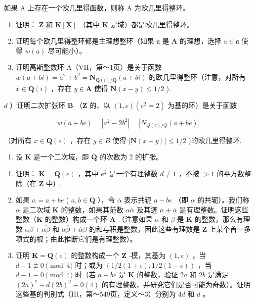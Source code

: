 如果 A 上存在一个欧几里得函数，则称 A 为欧几里得整环。

\begin{enumerate}
\def\labelenumi{\alph{enumi})}
\item
  证明： \(\mathbf{Z}\) 和 \(\mathbf{K}[\mathbf{X}]\) （其中 \(\mathbf{K}\) 是域）都是欧几里得整环。
\item
  证明每个欧几里得整环都是主理想整环（如果 \(\mathfrak{a}\) 是 \(\mathbf{A}\) 的理想，选择 \(a \in \mathfrak{a}\) 使得 \(w(a)\) 尽可能小）。
\item
  证明高斯整数环 A（VII，第～1页）是关于函数 \(w(a + bi) = a^2 + b^2 = \mathbf{N}_{\mathbf{Q}(i) / \mathbf{Q}}(a + bi)\) 的欧几里得整环（注意，对所有 \(x \in \mathbf{Q}(i)\) ，存在 \(y \in \mathbf{A}\) 使得 \(\mathbf{N}(x - y) \leqslant 1/2\) ).
\end{enumerate}

\(d\) ）证明二次扩张环 \(\mathbf{B}\) （\(\mathbf{Z}\) 的、以 \((1,e)(e^2 = 2)\) 为基的环）是关于函数

\[
w (a + b e) = \left| a ^ {2} - 2 b ^ {2} \right| = \left| N _ {Q (e) / Q} (a + b e) \right|
\]

（对所有 \(x \in \mathbf{Q}(e)\) ，存在 \(y \in B\) 使得 \(|\mathbf{N}(x - y)| \leqslant 1/2\) )的欧几里得整环.

\begin{enumerate}
\def\labelenumi{\arabic{enumi})}
\setcounter{enumi}{7}
\tightlist
\item
  设 \(\mathbf{K}\) 是一个二次域，即 \(\mathbf{Q}\) 的次数为 2 的扩张。
\end{enumerate}

\begin{enumerate}
\def\labelenumi{\alph{enumi})}
\item
  证明： \(\mathbf{K} = \mathbf{Q}(e)\) ，其中 \(e^2\) 是一个有理整数 \(d \neq 1\) ，不被 \(>1\) 的平方数整除（在 \(\mathbf{Z}\) 中）.
\item
  如果 \(\alpha = a + be\) ( \(a, b \in \mathbf{Q}\) ），令 \(\overline{\alpha}\) 表示共轭 \(a - be\) （即 \(\alpha\) 的共轭）。我们称 \(\alpha\) 是二次域 \(\mathbf{K}\) 的整数，如果其范数 \(\alpha\overline{\alpha}\) 及其迹 \(\alpha + \overline{\alpha}\) 是有理整数。证明这些整数（\(\mathbf{K}\) 的整数）构成一个环 \(\mathbf{A}\) （注意如果 \(\alpha\) 和 \(\beta\) 是 \(\mathbf{K}\) 的整数，那么有理数 \(\alpha\beta + \overline{\alpha\beta}\) 和 \(\alpha\overline{\beta} + \overline{\alpha}\beta\) 的和与积是整数，因此这些有理数是 \(\mathbf{Z}\) 上某个首一多项式的根；由此推断它们是有理整数）。
\item
  证明 \(\mathbf{K} = \mathbf{Q}(e)\) 的整数构成一个 \(\mathbf{Z}\) -模，其基为 \((1, e)\) ，当 \(d - 1 \not\equiv 0 \pmod{4}\) 时；或为 \((1/2(1 + e), 1/2(1 - e))\) ，当 \(d - 1 \equiv 0 \pmod{4}\) 时（若 \(a + be\) 是 \(\mathbf{K}\) 的整数，验证 \(2a\) 和 \(2b\) 是满足 \((2a)^2 - d(2b)^2 \equiv 0(4)\) 的有理整数，并研究它们是否可能为奇数）。证明这些基的判别式（III，第～549页，定义～3）分别为 \(4d\) 和 \(d\) 。
\end{enumerate}

